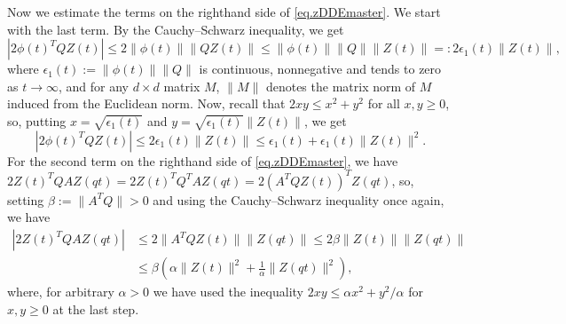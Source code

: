 \documentclass[a4paper,10pt,reqno]{amsart}
\numberwithin{equation}{section}
\theoremstyle{definition}
\theoremstyle{remark}
\DeclareMathOperator{\1}{\mathbbm 1}
\begin{document}
Now we estimate the terms on the righthand side of 
\eqref{eq.zDDEmaster}. 
We start with the last term. By the Cauchy--Schwarz inequality, we get
\[
|2\phi(t)^TQZ(t)|
\leq 2\|\phi(t)\|\|QZ(t)\|
\leq \|\phi(t)\|\|Q\|\|Z(t)\|=:2\epsilon_1(t)\|Z(t)\|,
\]
where $\epsilon_1(t):=\|\phi(t)\|\|Q\|$ is continuous, nonnegative and tends to zero as $t\to\infty$, and for any $d\times d$ matrix $M$, $\|M\|$ denotes the matrix norm of $M$ induced from the Euclidean norm.    
Now, recall that $2xy\leq x^2+y^2$ for all $x,y\geq 0$, so, putting $x=\sqrt{\epsilon_1(t)}$ and $y=\sqrt{\epsilon_1(t)}\|Z(t)\|$, we get 
\begin{equation} \label{eq.estt3}
|2\phi(t)^TQZ(t)|\leq
2\epsilon_1(t)\|Z(t)\|
\leq \epsilon_1(t)+\epsilon_1(t)\|Z(t)\|^2.
\end{equation}
For the second term on the righthand side of \eqref{eq.zDDEmaster}, we have 
$
2Z(t)^TQAZ(qt)=2Z(t)^TQ^TAZ(qt)=2 (A^TQZ(t))^T Z(qt)$,
so, setting $\beta:=\|A^TQ\|>0$ and using the  Cauchy--Schwarz inequality once again, we have 
\begin{align*}
|2Z(t)^TQAZ(qt)|&\leq 2\|A^TQZ(t)\|\|Z(qt)\|\leq 2\beta\|Z(t)\|\|Z(qt)\|\\
&\leq \beta\left(\alpha\|Z(t)\|^2+\frac{1}{\alpha}\|Z(qt)\|^2\right),
\end{align*}
where, for arbitrary $\alpha>0$ we have used the inequality $2xy\leq \alpha x^2+y^2/\alpha$ for $x, y\geq 0$ at the last step. 
\end{document}
